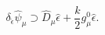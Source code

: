 \begin{equation}
\delta_{\hat \epsilon}\hat \psi_\mu\supset \hat D_\mu  
\hat \epsilon+ \frac{k}{2}g^{0}_{\mu}\hat \epsilon.
\end{equation}

